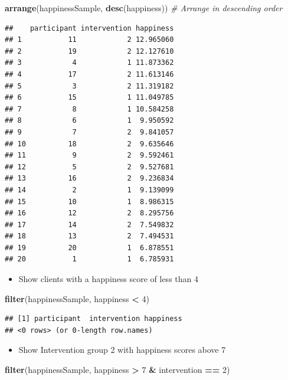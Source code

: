 \documentclass[
]{book}
\newenvironment{Shaded}{\begin{snugshade}}{\end{snugshade}}
\newcommand{\CommentTok}[1]{\textcolor[rgb]{0.56,0.35,0.01}{\textit{#1}}}
\newcommand{\DecValTok}[1]{\textcolor[rgb]{0.00,0.00,0.81}{#1}}
\newcommand{\KeywordTok}[1]{\textcolor[rgb]{0.13,0.29,0.53}{\textbf{#1}}}
\newcommand{\NormalTok}[1]{#1}
\newcommand{\OperatorTok}[1]{\textcolor[rgb]{0.81,0.36,0.00}{\textbf{#1}}}
\newcommand{\StringTok}[1]{\textcolor[rgb]{0.31,0.60,0.02}{#1}}
\providecommand{\tightlist}{%
  \setlength{\itemsep}{0pt}\setlength{\parskip}{0pt}}
\begin{document}
\begin{Shaded}
\begin{Highlighting}[]
\KeywordTok{arrange}\NormalTok{(happinessSample, }\KeywordTok{desc}\NormalTok{(happiness)) }\CommentTok{# Arrange in descending order}
\end{Highlighting}
\end{Shaded}

\begin{verbatim}
##    participant intervention happiness
## 1           11            2 12.965060
## 2           19            2 12.127610
## 3            4            1 11.873362
## 4           17            2 11.613146
## 5            3            2 11.319182
## 6           15            1 11.049785
## 7            8            1 10.584258
## 8            6            1  9.950592
## 9            7            2  9.841057
## 10          18            2  9.635646
## 11           9            2  9.592461
## 12           5            2  9.527681
## 13          16            2  9.236834
## 14           2            1  9.139099
## 15          10            1  8.986315
## 16          12            2  8.295756
## 17          14            2  7.549832
## 18          13            2  7.494531
## 19          20            1  6.878551
## 20           1            1  6.785931
\end{verbatim}

\begin{itemize}
\tightlist
\item
  Show clients with a happiness score of less than 4
\end{itemize}

\begin{Shaded}
\begin{Highlighting}[]
\KeywordTok{filter}\NormalTok{(happinessSample, happiness }\OperatorTok{<}\StringTok{ }\DecValTok{4}\NormalTok{)}
\end{Highlighting}
\end{Shaded}

\begin{verbatim}
## [1] participant  intervention happiness   
## <0 rows> (or 0-length row.names)
\end{verbatim}

\begin{itemize}
\tightlist
\item
  Show Intervention group 2 with happiness scores above 7
\end{itemize}

\begin{Shaded}
\begin{Highlighting}[]
\KeywordTok{filter}\NormalTok{(happinessSample, happiness }\OperatorTok{>}\StringTok{ }\DecValTok{7} \OperatorTok{&}\StringTok{ }\NormalTok{intervention }\OperatorTok{==}\StringTok{ }\DecValTok{2}\NormalTok{)}
\end{Highlighting}
\end{Shaded}
\end{document}
